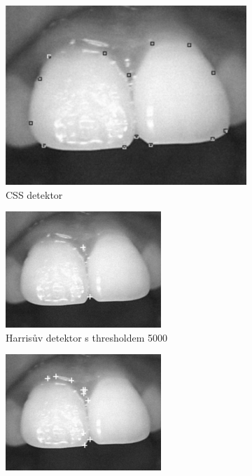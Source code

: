 \begin{figure}[h]\centering
    \centering
    \begin{subfigure}{0.45\textwidth}
    \includegraphics[width=0.9\linewidth]{obrazky-figures/css2.png}\hfill
    \caption{CSS detektor}
    \end{subfigure}
    \begin{subfigure}{0.45\textwidth}
    \includegraphics[width=0.9\linewidth]{obrazky-figures/harris1.png}\hfill
    \caption{Harrisův detektor s thresholdem 5000}
    \end{subfigure}
    \begin{subfigure}{0.45\textwidth}
    \includegraphics[width=0.9\linewidth]{obrazky-figures/harris2.png}\hfill

\end{subfigure}
\end{figure}
